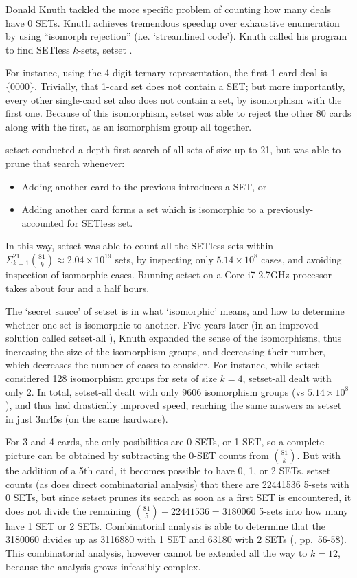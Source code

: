\documentclass[10pt]{amsart}
\newcommand{\SETSETb}{{\sc setset }}
\newcommand{\SETSETAb}{{\sc setset-all }}
\begin{document}
Donald Knuth tackled the more specific problem of counting how many deals have 0
SETs. Knuth achieves tremendous speedup over exhaustive enumeration by using
``isomorph rejection'' (i.e. `streamlined code'). Knuth called his program to
find SETless $k$-sets, \SETSETb \cite{SETSET}. 

For instance, using the 4-digit ternary representation, the first 1-card deal is
$\{0000\}$. Trivially, that 1-card set does not contain a SET; but more
importantly, every other single-card set also does not contain a set, by
isomorphism with the first one. Because of this isomorphism, \SETSETb was able
to reject the other 80 cards along with the first, as an isomorphism group all
together.

\SETSETb conducted a depth-first search of all sets of size up to 21, but was
able to prune that search whenever:
\begin{itemize}
\item Adding another card to the previous introduces a SET, or
\item Adding another card forms a set which is isomorphic to a
  previously-accounted for SETless set.
\end{itemize}
In this way, \SETSETb was able to count all the SETless sets within
$\Sigma_{k=1}^{21}\binom{81}{k}\approx 2.04\times 10^{19}$ sets, by inspecting
only $5.14\times 10^8$ cases, and avoiding inspection of isomorphic
cases. Running \SETSETb on a Core i7 2.7GHz processor takes about four and a half
hours.

The `secret sauce' of \SETSETb is in what `isomorphic' means, and how to
determine whether one set is isomorphic to another. Five years later (in an
improved solution called \SETSETAb \cite{SETSET-ALL}), Knuth expanded the sense
of the isomorphisms, thus increasing the size of the isomorphism groups, and
decreasing their number, which decreases the number of cases to consider. For
instance, while \SETSETb considered 128 isomorphism groups for sets of size
$k=4$, \SETSETAb dealt with only 2. In total, \SETSETAb dealt with only 9606
isomorphism groups (vs $5.14\times 10^8$), and thus had drastically improved
speed, reaching the same answers as \SETSETb in just 3m45s (on the same
hardware).

For 3 and 4 cards, the only posibilities are 0 SETs, or 1 SET, so a complete
picture can be obtained by subtracting the 0-SET counts from
$\binom{81}{k}$. But with the addition of a 5th card, it becomes possible to
have 0, 1, or 2 SETs. \SETSETb counts (as does direct combinatorial analysis)
that there are 22441536 5-sets with 0 SETs, but since \SETSETb prunes its search
as soon as a first SET is encountered, it does not divide the remaining
$\binom{81}{5}-22441536=3180060$ 5-sets into how many have 1 SET or 2
SETs. Combinatorial analysis is able to determine that the 3180060 divides up as
3116880 with 1 SET and 63180 with 2 SETs (\cite{JOS}, pp.~56-58). This
combinatorial analysis, however cannot be extended all the way to $k=12$,
because the analysis grows infeasibly complex.
\end{document}
